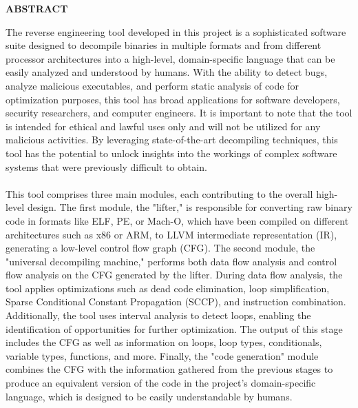 \thispagestyle{abstractpagestyle}

\vspace*{36pt}

\begin{center}
    \textbf{\fontsize{20pt}{24pt} \selectfont ABSTRACT}
\end{center}

\vspace{24pt}

The reverse engineering tool developed in this project is a sophisticated software suite designed to decompile binaries in multiple formats and from different processor architectures into a high-level, domain-specific language that can be easily analyzed and understood by humans. With the ability to detect bugs, analyze malicious executables, and perform static analysis of code for optimization purposes, this tool has broad applications for software developers, security researchers, and computer engineers. It is important to note that the tool is intended for ethical and lawful uses only and will not be utilized for any malicious activities. By leveraging state-of-the-art decompiling techniques, this tool has the potential to unlock insights into the workings of complex software systems that were previously difficult to obtain.
\paragraph{}
This tool comprises three main modules, each contributing to the overall high-level design. The first module, the "lifter," is responsible for converting raw binary code in formats like ELF, PE, or Mach-O, which have been compiled on different architectures such as x86 or ARM, to LLVM intermediate representation (IR), generating a low-level control flow graph (CFG). The second module, the "universal decompiling machine," performs both data flow analysis and control flow analysis on the CFG generated by the lifter. During data flow analysis, the tool applies optimizations such as dead code elimination, loop simplification, Sparse Conditional Constant Propagation (SCCP), and instruction combination. Additionally, the tool uses interval analysis to detect loops, enabling the identification of opportunities for further optimization. The output of this stage includes the CFG as well as information on loops, loop types, conditionals, variable types, functions, and more. Finally, the "code generation" module combines the CFG with the information gathered from the previous stages to produce an equivalent version of the code in the project's domain-specific language, which is designed to be easily understandable by humans.

\vfill